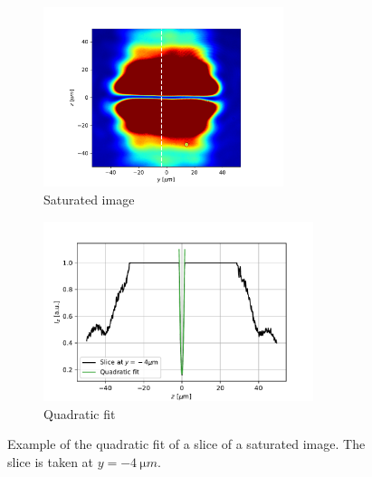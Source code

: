 \begin{figure}
    \begin{subfigure}{0.45\textwidth}
        \centering
        \includegraphics[height=5.25cm]{chapters/chapter_3/figures/fitquad_imsat.pdf}
        \caption{Saturated image}
        \label{fig:parabola_imsat}
    \end{subfigure}
    \begin{subfigure}{0.55\textwidth}
        \includegraphics[height=5.25cm]{chapters/chapter_3/figures/fitquad.pdf}
        \caption{Quadratic fit}
        \label{fig:parabola_fit}
    \end{subfigure}
    \caption{Example of the quadratic fit of a slice of a saturated image. The slice is taken at $y=\SI{-4}{\micro m}$.}
    \label{fig:parabola}
\end{figure}